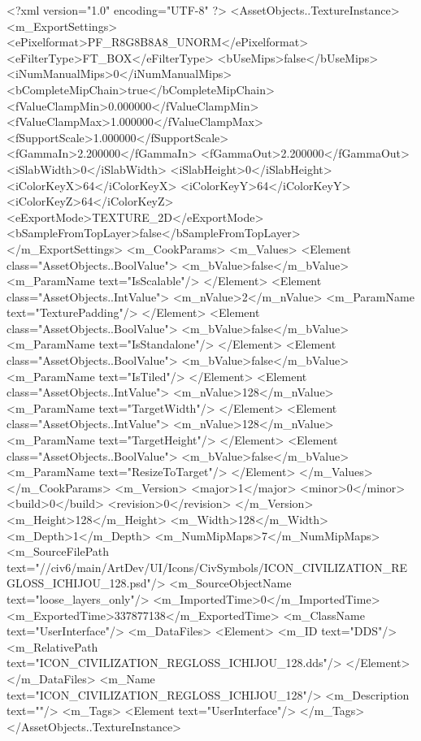 <?xml version="1.0" encoding="UTF-8" ?>
<AssetObjects..TextureInstance>
	<m_ExportSettings>
		<ePixelformat>PF_R8G8B8A8_UNORM</ePixelformat>
		<eFilterType>FT_BOX</eFilterType>
		<bUseMips>false</bUseMips>
		<iNumManualMips>0</iNumManualMips>
		<bCompleteMipChain>true</bCompleteMipChain>
		<fValueClampMin>0.000000</fValueClampMin>
		<fValueClampMax>1.000000</fValueClampMax>
		<fSupportScale>1.000000</fSupportScale>
		<fGammaIn>2.200000</fGammaIn>
		<fGammaOut>2.200000</fGammaOut>
		<iSlabWidth>0</iSlabWidth>
		<iSlabHeight>0</iSlabHeight>
		<iColorKeyX>64</iColorKeyX>
		<iColorKeyY>64</iColorKeyY>
		<iColorKeyZ>64</iColorKeyZ>
		<eExportMode>TEXTURE_2D</eExportMode>
		<bSampleFromTopLayer>false</bSampleFromTopLayer>
	</m_ExportSettings>
	<m_CookParams>
		<m_Values>
			<Element class="AssetObjects..BoolValue">
				<m_bValue>false</m_bValue>
				<m_ParamName text="IsScalable"/>
			</Element>
			<Element class="AssetObjects..IntValue">
				<m_nValue>2</m_nValue>
				<m_ParamName text="TexturePadding"/>
			</Element>
			<Element class="AssetObjects..BoolValue">
				<m_bValue>false</m_bValue>
				<m_ParamName text="IsStandalone"/>
			</Element>
			<Element class="AssetObjects..BoolValue">
				<m_bValue>false</m_bValue>
				<m_ParamName text="IsTiled"/>
			</Element>
			<Element class="AssetObjects..IntValue">
				<m_nValue>128</m_nValue>
				<m_ParamName text="TargetWidth"/>
			</Element>
			<Element class="AssetObjects..IntValue">
				<m_nValue>128</m_nValue>
				<m_ParamName text="TargetHeight"/>
			</Element>
			<Element class="AssetObjects..BoolValue">
				<m_bValue>false</m_bValue>
				<m_ParamName text="ResizeToTarget"/>
			</Element>
		</m_Values>
	</m_CookParams>
	<m_Version>
		<major>1</major>
		<minor>0</minor>
		<build>0</build>
		<revision>0</revision>
	</m_Version>
	<m_Height>128</m_Height>
	<m_Width>128</m_Width>
	<m_Depth>1</m_Depth>
	<m_NumMipMaps>7</m_NumMipMaps>
	<m_SourceFilePath text="//civ6/main/ArtDev/UI/Icons/CivSymbols/ICON_CIVILIZATION_REGLOSS_ICHIJOU_128.psd"/>
	<m_SourceObjectName text="loose_layers_only"/>
	<m_ImportedTime>0</m_ImportedTime>
	<m_ExportedTime>337877138</m_ExportedTime>
	<m_ClassName text="UserInterface"/>
	<m_DataFiles>
		<Element>
			<m_ID text="DDS"/>
			<m_RelativePath text="ICON_CIVILIZATION_REGLOSS_ICHIJOU_128.dds"/>
		</Element>
	</m_DataFiles>
	<m_Name text="ICON_CIVILIZATION_REGLOSS_ICHIJOU_128"/>
	<m_Description text=""/>
	<m_Tags>
		<Element text="UserInterface"/>
	</m_Tags>
</AssetObjects..TextureInstance>

